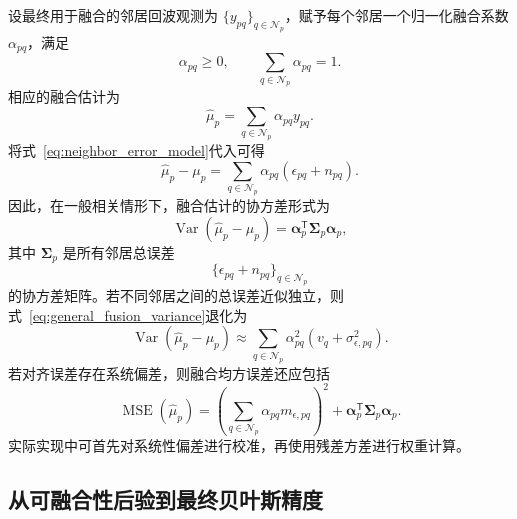 \documentclass[11pt,a4paper]{ctexart}
\numberwithin{equation}{section}
\newcommand{\Var}{\operatorname{Var}}
\begin{document}
设最终用于融合的邻居回波观测为 $\{y_{pq}\}_{q\in\mathcal N_p}$，赋予每个邻居一个归一化融合系数 $\alpha_{pq}$，满足
\begin{equation}
    \alpha_{pq}\geq0,
    \qquad
    \sum_{q\in\mathcal N_p}\alpha_{pq}=1.
    \label{eq:alpha_constraint}
\end{equation}
相应的融合估计为
\begin{equation}
    \hat\mu_p
    =
    \sum_{q\in\mathcal N_p}
    \alpha_{pq}y_{pq}.
    \label{eq:weighted_estimator}
\end{equation}
将式~\eqref{eq:neighbor_error_model}代入可得
\begin{equation}
    \hat\mu_p-\mu_p
    =
    \sum_{q\in\mathcal N_p}
    \alpha_{pq}
    (\epsilon_{pq}+n_{pq}).
    \label{eq:total_fusion_error}
\end{equation}
因此，在一般相关情形下，融合估计的协方差形式为
\begin{equation}
    \Var(\hat\mu_p-\mu_p)
    =
    \bm\alpha_p^{\mathsf T}
    \bm\Sigma_p
    \bm\alpha_p,
    \label{eq:general_fusion_variance}
\end{equation}
其中 $\bm\Sigma_p$ 是所有邻居总误差
\[
\{\epsilon_{pq}+n_{pq}\}_{q\in\mathcal N_p}
\]
的协方差矩阵。若不同邻居之间的总误差近似独立，则式~\eqref{eq:general_fusion_variance}退化为
\begin{equation}
    \Var(\hat\mu_p-\mu_p)
    \approx
    \sum_{q\in\mathcal N_p}
    \alpha_{pq}^{2}
    \left(v_q+\sigma_{\epsilon,pq}^{2}\right).
    \label{eq:independent_fusion_variance}
\end{equation}
若对齐误差存在系统偏差，则融合均方误差还应包括
\begin{equation}
    \operatorname{MSE}(\hat\mu_p)
    =
    \left(
    \sum_{q\in\mathcal N_p}
    \alpha_{pq}m_{\epsilon,pq}
    \right)^2
    +
    \bm\alpha_p^{\mathsf T}
    \bm\Sigma_p
    \bm\alpha_p.
    \label{eq:fusion_mse}
\end{equation}
实际实现中可首先对系统性偏差进行校准，再使用残差方差进行权重计算。

\subsection{从可融合性后验到最终贝叶斯精度}
\end{document}
